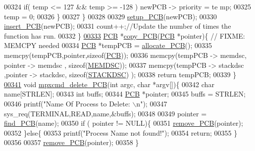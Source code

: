 \begin{DoxyCode}
00324                         \textcolor{keywordflow}{if}( temp <= 127 && temp >= -128 ) newPCB -> priority = te
      mp;
00325                         temp = 0;
00326                 \}
00327         \}
00328         
00329         \hyperlink{mpx__r2_8c_a20991a79e940fd54095a05f5b25cfaf3}{setup_PCB}(newPCB);
00330         \hyperlink{mpx__r2_8c_aa3b334e3a5afd6e590917667ad359a6f}{insert_PCB}(newPCB);
00331         count++;\textcolor{comment}{//Update the number of times the function has run.}
00332 \}
\hypertarget{mpx__r2_8c_source_l00333}{}\hyperlink{mpx__r2_8c_aca3ad02d2b4c68f7653b0adf2c484ff6}{00333} \hyperlink{structprocess}{PCB} *\hyperlink{mpx__r2_8c_aca3ad02d2b4c68f7653b0adf2c484ff6}{copy_PCB}(\hyperlink{structprocess}{PCB} *pointer)\{ \textcolor{comment}{// FIXME: MEMCPY needed}
00334                 \hyperlink{structprocess}{PCB} *tempPCB = \hyperlink{mpx__r2_8c_a58a8a1ea0a96b9ecf0be29179a5a0a1e}{allocate_PCB}();
00335                 memcpy(tempPCB,pointer,\textcolor{keyword}{sizeof}(\hyperlink{structprocess}{PCB}));
00336                 memcpy(tempPCB -> memdsc, pointer -> memdsc , \textcolor{keyword}{sizeof}(\hyperlink{structmem}{MEMDSC}));
00337                 memcpy(tempPCB -> stackdsc ,pointer -> stackdsc, \textcolor{keyword}{sizeof}(\hyperlink{structstack}{STACKDSC})
      );
00338         \textcolor{keywordflow}{return} tempPCB;
00339 \}
\hypertarget{mpx__r2_8c_source_l00341}{}\hyperlink{mpx__r2_8h_ae6d6afa9fefa158029528a24841c453a}{00341} \textcolor{keywordtype}{void} \hyperlink{mpx__r2_8c_ae6d6afa9fefa158029528a24841c453a}{mpxcmd_delete_PCB}(\textcolor{keywordtype}{int} argc, \textcolor{keywordtype}{char} *argv[])\{
00342         \textcolor{keywordtype}{char} name[STRLEN];
00343         \textcolor{keywordtype}{int} buffs;
00344         \hyperlink{structprocess}{PCB} *pointer;
00345         buffs = STRLEN;
00346         printf(\textcolor{stringliteral}{"Name Of Process to Delete: \(\backslash\)n"});
00347         sys\_req(TERMINAL,READ,name,&buffs);
00348         
00349         pointer = \hyperlink{mpx__r2_8c_a612a6abcb66c688a32f33abc93ff3990}{find_PCB}(name);
00350         \textcolor{keywordflow}{if} ( pointer != NULL)\{
00351                 \hyperlink{mpx__r2_8c_af30a3658210d449b4b53e5be2ed2bc2e}{remove_PCB}(pointer);
00352         \}\textcolor{keywordflow}{else}\{
00353                 printf(\textcolor{stringliteral}{"Process Name not found!"});
00354                 \textcolor{keywordflow}{return};
00355         \}
00356         
00357         \hyperlink{mpx__r2_8c_af30a3658210d449b4b53e5be2ed2bc2e}{remove_PCB}(pointer);
00358 \}

\end{DoxyCode}
